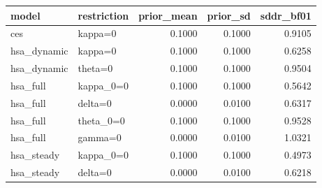 \begin{tabular}{llrrr}
\toprule
model & restriction & prior\_mean & prior\_sd & sddr\_bf01 \\
\midrule
ces & kappa=0 & 0.1000 & 0.1000 & 0.9105 \\
hsa\_dynamic & kappa=0 & 0.1000 & 0.1000 & 0.6258 \\
hsa\_dynamic & theta=0 & 0.1000 & 0.1000 & 0.9504 \\
hsa\_full & kappa\_0=0 & 0.1000 & 0.1000 & 0.5642 \\
hsa\_full & delta=0 & 0.0000 & 0.0100 & 0.6317 \\
hsa\_full & theta\_0=0 & 0.1000 & 0.1000 & 0.9528 \\
hsa\_full & gamma=0 & 0.0000 & 0.0100 & 1.0321 \\
hsa\_steady & kappa\_0=0 & 0.1000 & 0.1000 & 0.4973 \\
hsa\_steady & delta=0 & 0.0000 & 0.0100 & 0.6218 \\
\bottomrule
\end{tabular}
